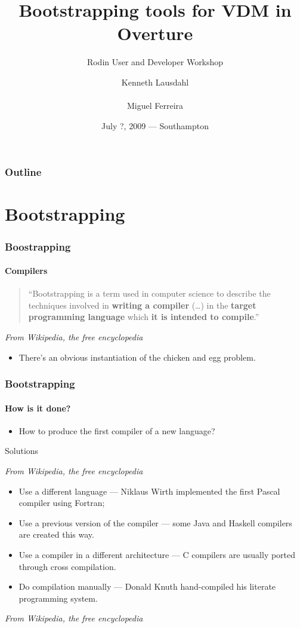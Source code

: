 \documentclass[slidestop,uncompress,mathserif,notes]{beamer}
\title[Bootstrapping in Overture]{Bootstrapping tools for VDM in Overture}
\subtitle{Rodin User and Developer Workshop}
\author[K. Lausdahl, M. Ferreira]{
  Kenneth Lausdahl \\
  \mail{kenneth AT lausdahl.com} \\
  Miguel Ferreira \\
  \mail{m.ferreira AT sig.nl}
}
\institute[IHA, SIG]{
  Aarhus School of Engineering\\
  Software Improvement Group
}
\date{July ?, 2009 --- Southampton}
\newcommand{\from}[1]{%
\noindent%
\begin{flushright}%
    \emph{\footnotesize #1}%
\end{flushright}%
}
\begin{document}
 

\begin{frame}
	\titlepage
\end{frame}

\begin{frame}
  \frametitle{Outline}
  \tableofcontents %
\end{frame}


\section{Bootstrapping}
\label{sec:bootstrapping}

\begin{frame}
  \frametitle{Boostrapping}
  \framesubtitle{Compilers}


  \begin{quotation}
	``Bootstrapping is a term used in computer science to describe the techniques involved in \textbf{writing a compiler} (\dots) in the \textbf{target programming language} which \textbf{it is intended to compile}.''
  \end{quotation}
  \from{From Wikipedia, the free encyclopedia}

  \pause
  \begin{itemize}
	\item There's an obvious instantiation of the \alert{chicken and egg} problem.
  \end{itemize}
\end{frame}

\begin{frame}
  \frametitle{Bootstrapping}
  \framesubtitle{How is it done?}

  \pause
  \begin{itemize}
	\item How to produce the first compiler of a \alert{new} language?
  \end{itemize}

  \pause
  \begin{block}{Solutions \from{From Wikipedia, the free encyclopedia}}
  \begin{itemize}
	  \pause
	\item Use a different language  --- Niklaus Wirth implemented the first Pascal compiler using Fortran;
	  \pause
	\item Use a previous version of the compiler --- some Java and Haskell compilers are created this way.
	  \pause
	\item Use a compiler in a different architecture --- C compilers are usually ported through cross compilation.
	  \pause
	\item Do compilation manually --- Donald Knuth hand-compiled his literate programming system.
  \end{itemize}
  \end{block}
  \from{From Wikipedia, the free encyclopedia}
\end{frame}
\end{document}
